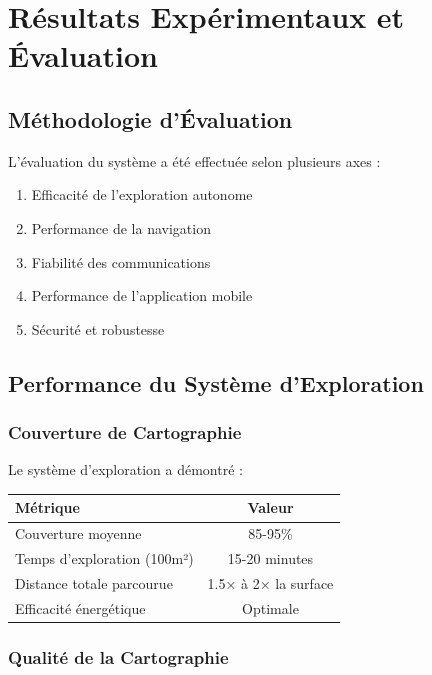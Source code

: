 \documentclass[12pt,a4paper,oneside]{report}
\begin{document}
\chapter{Résultats Expérimentaux et Évaluation}

\section{Méthodologie d'Évaluation}

L'évaluation du système a été effectuée selon plusieurs axes :

\begin{enumerate}
  \item Efficacité de l'exploration autonome
  \item Performance de la navigation
  \item Fiabilité des communications
  \item Performance de l'application mobile
  \item Sécurité et robustesse
\end{enumerate}

\section{Performance du Système d'Exploration}

\subsection{Couverture de Cartographie}

Le système d'exploration a démontré :

\begin{table}[H]
\centering
\begin{tabular}{|l|c|}
\hline
\textbf{Métrique} & \textbf{Valeur} \\
\hline
Couverture moyenne & 85-95\% \\
Temps d'exploration (100m²) & 15-20 minutes \\
Distance totale parcourue & 1.5× à 2× la surface \\
Efficacité énergétique & Optimale \\
\hline
\end{tabular}
\end{table}

\subsection{Qualité de la Cartographie}
\end{document}
